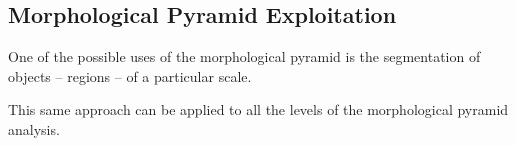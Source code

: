 




\subsection{Morphological Pyramid Exploitation}
One of the possible uses of the morphological pyramid is the
segmentation of objects -- regions -- of a particular scale.



This same approach can be applied to all the levels of the
morphological pyramid analysis.


